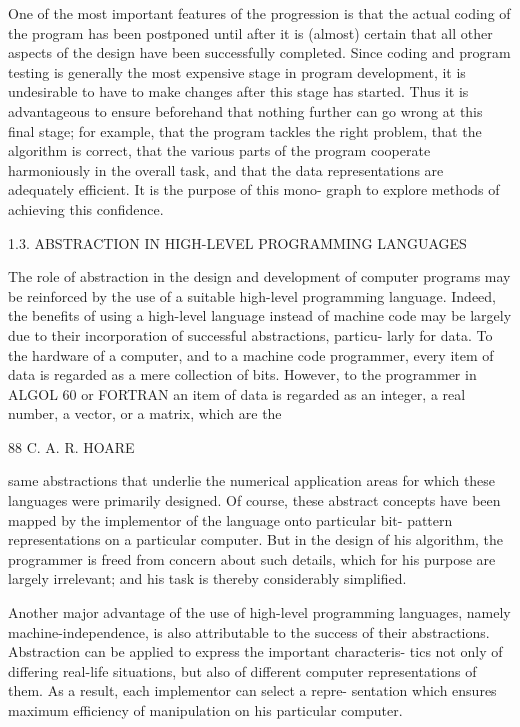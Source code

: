One of the most important features of the progression is that the actual coding of the program has been postponed until after it is (almost) certain that all other aspects of the design have been successfully completed. Since coding and program testing is generally the most expensive stage in program development, it is undesirable to have to make changes after this stage has started. Thus it is advantageous to ensure beforehand that nothing further can go wrong at this final stage; for example, that the program tackles the right problem, that the algorithm is correct, that the various parts of the program cooperate harmoniously in the overall task, and that the data representations are adequately efficient. It is the purpose of this mono- graph to explore methods of achieving this confidence.

1.3. ABSTRACTION IN HIGH-LEVEL PROGRAMMING LANGUAGES

The role of abstraction in the design and development of computer programs may be reinforced by the use of a suitable high-level programming language. Indeed, the benefits of using a high-level language instead of machine code may be largely due to their incorporation of successful abstractions, particu- larly for data. To the hardware of a computer, and to a machine code programmer, every item of data is regarded as a mere collection of bits. However, to the programmer in ALGOL 60 or FORTRAN an item of data is regarded as an integer, a real number, a vector, or a matrix, which are the

88 C. A. R. HOARE

same abstractions that underlie the numerical application areas for which these languages were primarily designed. Of course, these abstract concepts have been mapped by the implementor of the language onto particular bit- pattern representations on a particular computer. But in the design of his algorithm, the programmer is freed from concern about such details, which for his purpose are largely irrelevant; and his task is thereby considerably simplified.

Another major advantage of the use of high-level programming languages, namely machine-independence, is also attributable to the success of their abstractions. Abstraction can be applied to express the important characteris- tics not only of differing real-life situations, but also of different computer representations of them. As a result, each implementor can select a repre- sentation which ensures maximum efficiency of manipulation on his particular computer.

